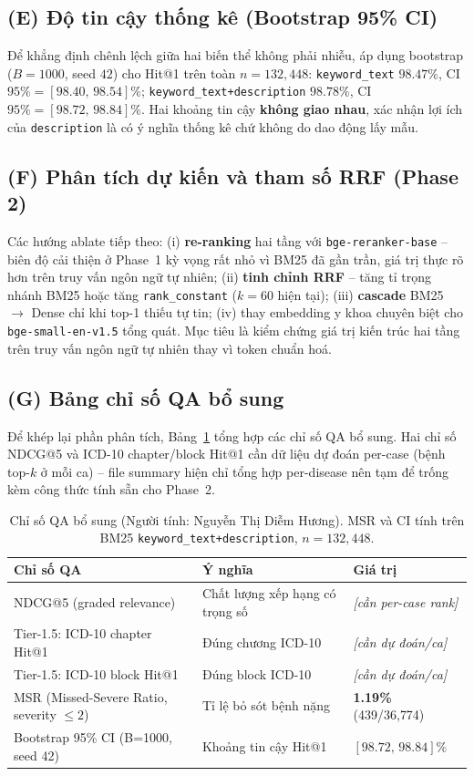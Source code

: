 \documentclass[11pt,a4paper]{article}
\begin{document}
\subsection*{(E) Độ tin cậy thống kê (Bootstrap 95\% CI)}
Để khẳng định chênh lệch giữa hai biến thể không phải nhiễu, áp dụng bootstrap
($B=1000$, seed $42$) cho Hit@1 trên toàn $n=132{,}448$:
\texttt{keyword\_text} $98.47\%$, CI $95\%=[98.40,\,98.54]\%$;
\texttt{keyword\_text+description} $98.78\%$, CI $95\%=[98.72,\,98.84]\%$.
Hai khoảng tin cậy \textbf{không giao nhau}, xác nhận lợi ích của
\texttt{description} là có ý nghĩa thống kê chứ không do dao động lấy mẫu.

\subsection*{(F) Phân tích dự kiến và tham số RRF (Phase 2)}
Các hướng ablate tiếp theo: (i) \textbf{re-ranking} hai tầng với
\texttt{bge-reranker-base} -- biên độ cải thiện ở Phase~1 kỳ vọng rất nhỏ vì BM25
đã gần trần, giá trị thực rõ hơn trên truy vấn ngôn ngữ tự nhiên;
(ii) \textbf{tinh chỉnh RRF} -- tăng tỉ trọng nhánh BM25 hoặc tăng
\texttt{rank\_constant} ($k=60$ hiện tại); (iii) \textbf{cascade}
BM25 $\rightarrow$ Dense chỉ khi top-1 thiếu tự tin; (iv) thay embedding y khoa
chuyên biệt cho \texttt{bge-small-en-v1.5} tổng quát. Mục tiêu là kiểm chứng giá
trị kiến trúc hai tầng trên truy vấn ngôn ngữ tự nhiên thay vì token chuẩn hoá.

\subsection*{(G) Bảng chỉ số QA bổ sung}
Để khép lại phần phân tích, Bảng~\ref{tab:qa} tổng hợp các chỉ số QA bổ sung. Hai
chỉ số NDCG@5 và ICD-10 chapter/block Hit@1 cần dữ liệu dự đoán per-case (bệnh
top-$k$ ở mỗi ca) -- file summary hiện chỉ tổng hợp per-disease nên tạm để trống
kèm công thức tính sẵn cho Phase~2.

\begin{table}[H]
\centering
\small
\caption{Chỉ số QA bổ sung (Người tính: Nguyễn Thị Diễm Hương). MSR và CI tính
trên BM25 \texttt{keyword\_text+description}, $n=132{,}448$.}
\label{tab:qa}
\begin{tabular}{p{5.6cm}p{3.4cm}p{3.2cm}}
\hline
\textbf{Chỉ số QA} & \textbf{Ý nghĩa} & \textbf{Giá trị}\\
\hline
NDCG@5 (graded relevance) & Chất lượng xếp hạng có trọng số & \textit{[cần per-case rank]}\\
Tier-1.5: ICD-10 chapter Hit@1 & Đúng chương ICD-10 & \textit{[cần dự đoán/ca]}\\
Tier-1.5: ICD-10 block Hit@1 & Đúng block ICD-10 & \textit{[cần dự đoán/ca]}\\
MSR (Missed-Severe Ratio, severity $\le 2$) & Tỉ lệ bỏ sót bệnh nặng & \textbf{1.19\%} (439/36{,}774)\\
Bootstrap 95\% CI (B=1000, seed 42) & Khoảng tin cậy Hit@1 & $[98.72,\,98.84]\%$\\
\hline
\end{tabular}
\end{table}
\end{document}
